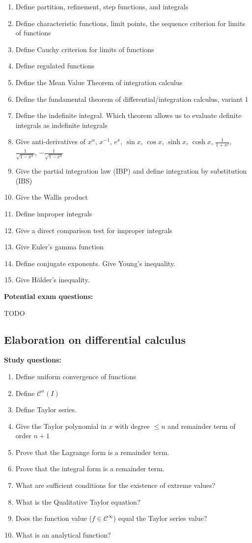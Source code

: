 \documentclass{article}
\begin{document}
\begin{enumerate}
  \item Define partition, refinement, step functions, and integrals
  \item Define characteristic functions, limit points, the sequence criterion for limits of functions
  \item Define Cauchy criterion for limits of functions
  \item Define regulated functions
  \item Define the Mean Value Theorem of integration calculus
  \item Define the fundamental theorem of differential/integration calculus, variant 1
  \item Define the indefinite integral. Which theorem allows us to evaluate definite integrals as indefinite integrals
  \item Give anti-derivatives of $x^\alpha$, $x^{-1}$, $e^x$, $\sin{x}$, $\cos{x}$, $\sinh{x}$, $\cosh{x}$, $\frac{1}{1 + x^2}$, $\frac{1}{\sqrt{1 - x^2}}$, $-\frac{1}{\sqrt{1 - x^2}}$
  \item Give the partial integration law (IBP) and define integration by substitution (IBS)
  \item Give the Wallis product
  \item Define improper integrals
  \item Give a direct comparison test for improper integrals
  \item Give Euler's gamma function
  \item Define conjugate exponents. Give Young's inequality.
  \item Give Hölder's inequality.
\end{enumerate}

\textbf{Potential exam questions:}

TODO

\subsection{Elaboration on differential calculus}

\textbf{Study questions:}

\begin{enumerate}
  \item Define uniform convergence of functions
  \item Define $\mathcal C^n(I)$
  \item Define Taylor series.
  \item Give the Taylor polynomial in $x$ with degree $\leq n$ and remainder term of order $n+1$
  \item Prove that the Lagrange form is a remainder term.
  \item Prove that the integral form is a remainder term.
  \item What are sufficient conditions for the existence of extreme values?
  \item What is the Qualitative Taylor equation?
  \item Does the function value ($f \in \mathcal C^\infty$) equal the Taylor series value?
  \item What is an analytical function?
\end{enumerate}
\end{document}
